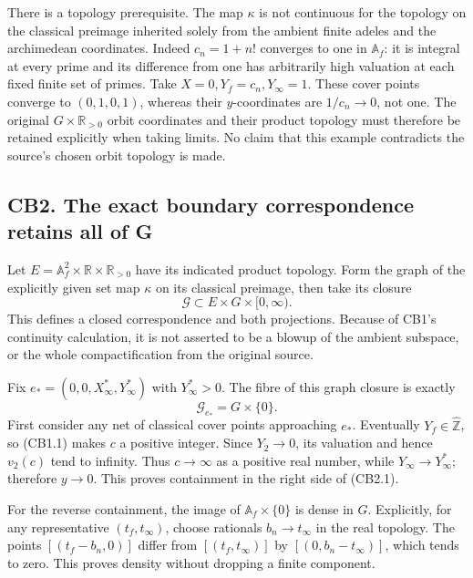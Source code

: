 There is a topology prerequisite. The map \(\kappa\) is not continuous
for the topology on the classical preimage inherited solely from the
ambient finite adeles and the archimedean coordinates. Indeed
\(c_n=1+n!\) converges to one in \(\mathbb A_f\): it is integral at
every prime and its difference from one has arbitrarily high valuation
at each fixed finite set of primes. Take \(X=0,Y_f=c_n,Y_\infty=1\).
These cover points converge to \((0,1,0,1)\), whereas their
\(y\)-coordinates are \(1/c_n\to0\), not one. The original
\(G\times\mathbb R_{>0}\) orbit coordinates and their product topology
must therefore be retained explicitly when taking limits. No claim that
this example contradicts the source's chosen orbit topology is made.

\subsection{CB2. The exact boundary correspondence retains all of
G}\label{cb2.-the-exact-boundary-correspondence-retains-all-of-g}

Let \(E=\mathbb A_f^2\times\mathbb R\times\mathbb R_{>0}\) have its
indicated product topology. Form the graph of the explicitly given set
map \(\kappa\) on its classical preimage, then take its closure \[
\mathscr G\subset E\times G\times[0,\infty).
\] This defines a closed correspondence and both projections. Because of
CB1's continuity calculation, it is not asserted to be a blowup of the
ambient subspace, or the whole compactification from the original
source.

Fix \(e_*=(0,0,X_\infty^*,Y_\infty^*)\) with \(Y_\infty^*>0\). The fibre
of this graph closure is exactly \[
\boxed{\mathscr G_{e_*}=G\times\{0\}.}
\tag{CB2.1}
\] First consider any net of classical cover points approaching \(e_*\).
Eventually \(Y_f\in\widehat{\mathbb Z}\), so (CB1.1) makes \(c\) a
positive integer. Since \(Y_2\to0\), its valuation and hence \(v_2(c)\)
tend to infinity. Thus \(c\to\infty\) as a positive real number, while
\(Y_\infty\to Y_\infty^*\); therefore \(y\to0\). This proves containment
in the right side of (CB2.1).

For the reverse containment, the image of \(\mathbb A_f\times\{0\}\) is
dense in \(G\). Explicitly, for any representative \((t_f,t_\infty)\),
choose rationals \(b_n\to t_\infty\) in the real topology. The points
\([(t_f-b_n,0)]\) differ from \([(t_f,t_\infty)]\) by
\([(0,b_n-t_\infty)]\), which tends to zero. This proves density without
dropping a finite component.


